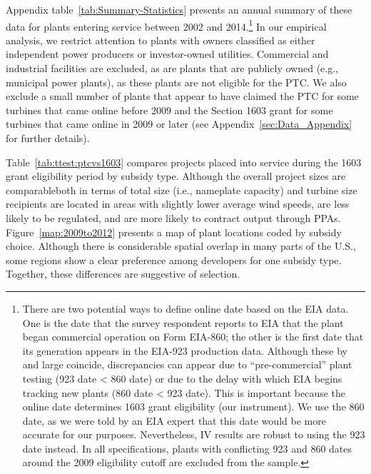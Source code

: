 \documentclass[12pt]{article}
\begin{document}
Appendix table~\ref{tab:Summary-Statistics} presents an annual summary of these data for plants entering service between 2002 and 2014.\footnote{There are two potential ways to define online date based on the EIA data. One is the date that the survey respondent reports to EIA that the plant began commercial operation on Form EIA-860; the other is the first date that its generation appears in the EIA-923 production data. Although these by and large coincide, discrepancies can appear due to ``pre-commercial'' plant testing (923 date \textless{} 860 date) or due to the delay with which EIA begins tracking new plants (860 date \textless{} 923 date). This is important because the online date determines 1603 grant eligibility (our instrument). We use the 860 date, as we were told by an EIA expert that this date would be more accurate for our purposes. Nevertheless, IV results are robust to using the 923 date instead. In all specifications, plants with conflicting 923 and 860 dates around the 2009 eligibility cutoff are excluded from the sample.} In our empirical analysis, we restrict attention to plants with owners classified as either independent power producers or investor-owned utilities. Commercial and industrial facilities are excluded, as are plants that are publicly owned (e.g., municipal power plants), as these plants are not eligible for the PTC. We also exclude a small number of plants that appear to have claimed the PTC for some turbines that came online before 2009 and the Section 1603 grant for some turbines that came online in 2009 or later (see Appendix~\ref{sec:Data_Appendix} for further details).

Table~\ref{tab:ttest:ptcvs1603} compares projects placed into service during the 1603 grant eligibility period by subsidy type. Although the overall project sizes are comparable\textemdash both in terms of total size (i.e., nameplate capacity) and turbine size recipients are located in areas with slightly lower average wind speeds, are less likely to be regulated, and are more likely to contract output through PPAs. Figure~\ref{map:2009to2012} presents a map of plant locations coded by subsidy choice. Although there is considerable spatial overlap in many parts of the U.S., some regions show a clear preference among developers for one subsidy type. Together, these differences are suggestive of selection.
\end{document}
